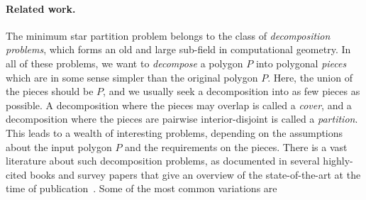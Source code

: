 \documentclass[10pt,a4paper]{article}
\makeatletter
\newcommand\IfRestateTF{%
  \ifx\label\thmt@gobble@label %
    \expandafter\@firstoftwo
  \else
    \expandafter\@secondoftwo
  \fi
}
\newcommand{\RestateRemark}{\IfRestateTF{{\normalfont\bfseries (Restated) }}{}}
\makeatother
\begin{document}


\paragraph{Related work.}
The minimum star partition problem belongs to the class of \emph{decomposition problems}, which forms an old and large sub-field in computational geometry.
In all of these problems, we want to \emph{decompose} a polygon $P$ into polygonal \emph{pieces} which are in some sense simpler than the original polygon $P$.
Here, the union of the pieces should be $P$, and we usually seek a decomposition into as few pieces as possible.
A decomposition where the pieces may overlap is called a \emph{cover}, and a decomposition where the pieces are pairwise interior-disjoint is called a \emph{partition}.
This leads to a wealth of interesting problems,
depending on the assumptions about the input polygon $P$ and the requirements on the pieces.
There is a vast literature about such decomposition problems, as documented in several highly-cited books and survey papers that give an overview of the state-of-the-art at the time of publication~\cite{keil1985minimum,chazelle1985approximation,o1987art,DBLP:journals/pieee/Shermer92,chazelle1994decomposition,keil1999polygon,o2004polygons}.
Some of the most common variations are
\end{document}
